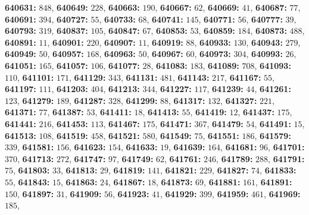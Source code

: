 \textsf{\bfseries 640631:} $848$, \textsf{\bfseries 640649:} $228$, \textsf{\bfseries 640663:} $190$, \textsf{\bfseries 640667:} $62$, \textsf{\bfseries 640669:} $41$, \textsf{\bfseries 640687:} $77$, \textsf{\bfseries 640691:} $394$, \textsf{\bfseries 640727:} $55$, \textsf{\bfseries 640733:} $68$, \textsf{\bfseries 640741:} $145$, \textsf{\bfseries 640771:} $56$, \textsf{\bfseries 640777:} $39$, \textsf{\bfseries 640793:} $319$, \textsf{\bfseries 640837:} $105$, \textsf{\bfseries 640847:} $67$, \textsf{\bfseries 640853:} $53$, \textsf{\bfseries 640859:} $184$, \textsf{\bfseries 640873:} $488$, \textsf{\bfseries 640891:} $11$, \textsf{\bfseries 640901:} $220$, \textsf{\bfseries 640907:} $11$, \textsf{\bfseries 640919:} $88$, \textsf{\bfseries 640933:} $130$, \textsf{\bfseries 640943:} $279$, \textsf{\bfseries 640949:} $50$, \textsf{\bfseries 640957:} $168$, \textsf{\bfseries 640963:} $50$, \textsf{\bfseries 640967:} $60$, \textsf{\bfseries 640973:} $304$, \textsf{\bfseries 640993:} $26$, \textsf{\bfseries 641051:} $165$, \textsf{\bfseries 641057:} $106$, \textsf{\bfseries 641077:} $28$, \textsf{\bfseries 641083:} $183$, \textsf{\bfseries 641089:} $708$, \textsf{\bfseries 641093:} $110$, \textsf{\bfseries 641101:} $171$, \textsf{\bfseries 641129:} $343$, \textsf{\bfseries 641131:} $481$, \textsf{\bfseries 641143:} $217$, \textsf{\bfseries 641167:} $55$, \textsf{\bfseries 641197:} $111$, \textsf{\bfseries 641203:} $404$, \textsf{\bfseries 641213:} $344$, \textsf{\bfseries 641227:} $117$, \textsf{\bfseries 641239:} $44$, \textsf{\bfseries 641261:} $123$, \textsf{\bfseries 641279:} $189$, \textsf{\bfseries 641287:} $328$, \textsf{\bfseries 641299:} $88$, \textsf{\bfseries 641317:} $132$, \textsf{\bfseries 641327:} $221$, \textsf{\bfseries 641371:} $77$, \textsf{\bfseries 641387:} $53$, \textsf{\bfseries 641411:} $18$, \textsf{\bfseries 641413:} $55$, \textsf{\bfseries 641419:} $12$, \textsf{\bfseries 641437:} $175$, \textsf{\bfseries 641441:} $216$, \textsf{\bfseries 641453:} $113$, \textsf{\bfseries 641467:} $175$, \textsf{\bfseries 641471:} $367$, \textsf{\bfseries 641479:} $54$, \textsf{\bfseries 641491:} $15$, \textsf{\bfseries 641513:} $108$, \textsf{\bfseries 641519:} $458$, \textsf{\bfseries 641521:} $580$, \textsf{\bfseries 641549:} $75$, \textsf{\bfseries 641551:} $186$, \textsf{\bfseries 641579:} $339$, \textsf{\bfseries 641581:} $156$, \textsf{\bfseries 641623:} $154$, \textsf{\bfseries 641633:} $19$, \textsf{\bfseries 641639:} $164$, \textsf{\bfseries 641681:} $96$, \textsf{\bfseries 641701:} $370$, \textsf{\bfseries 641713:} $272$, \textsf{\bfseries 641747:} $97$, \textsf{\bfseries 641749:} $62$, \textsf{\bfseries 641761:} $246$, \textsf{\bfseries 641789:} $288$, \textsf{\bfseries 641791:} $75$, \textsf{\bfseries 641803:} $33$, \textsf{\bfseries 641813:} $29$, \textsf{\bfseries 641819:} $141$, \textsf{\bfseries 641821:} $229$, \textsf{\bfseries 641827:} $74$, \textsf{\bfseries 641833:} $55$, \textsf{\bfseries 641843:} $15$, \textsf{\bfseries 641863:} $24$, \textsf{\bfseries 641867:} $18$, \textsf{\bfseries 641873:} $69$, \textsf{\bfseries 641881:} $161$, \textsf{\bfseries 641891:} $150$, \textsf{\bfseries 641897:} $31$, \textsf{\bfseries 641909:} $56$, \textsf{\bfseries 641923:} $41$, \textsf{\bfseries 641929:} $399$, \textsf{\bfseries 641959:} $461$, \textsf{\bfseries 641969:} $185$, 
